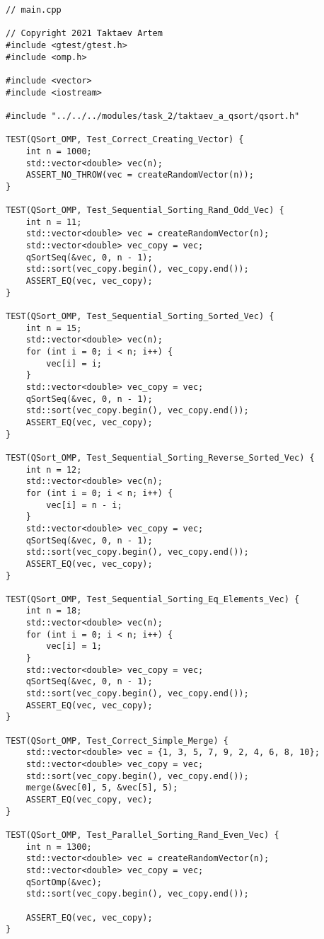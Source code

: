 \documentclass{report}
\begin{document}
\begin{lstlisting}
// main.cpp

// Copyright 2021 Taktaev Artem
#include <gtest/gtest.h>
#include <omp.h>

#include <vector>
#include <iostream>

#include "../../../modules/task_2/taktaev_a_qsort/qsort.h"

TEST(QSort_OMP, Test_Correct_Creating_Vector) {
    int n = 1000;
    std::vector<double> vec(n);
    ASSERT_NO_THROW(vec = createRandomVector(n));
}

TEST(QSort_OMP, Test_Sequential_Sorting_Rand_Odd_Vec) {
    int n = 11;
    std::vector<double> vec = createRandomVector(n);
    std::vector<double> vec_copy = vec;
    qSortSeq(&vec, 0, n - 1);
    std::sort(vec_copy.begin(), vec_copy.end());
    ASSERT_EQ(vec, vec_copy);
}

TEST(QSort_OMP, Test_Sequential_Sorting_Sorted_Vec) {
    int n = 15;
    std::vector<double> vec(n);
    for (int i = 0; i < n; i++) {
        vec[i] = i;
    }
    std::vector<double> vec_copy = vec;
    qSortSeq(&vec, 0, n - 1);
    std::sort(vec_copy.begin(), vec_copy.end());
    ASSERT_EQ(vec, vec_copy);
}

TEST(QSort_OMP, Test_Sequential_Sorting_Reverse_Sorted_Vec) {
    int n = 12;
    std::vector<double> vec(n);
    for (int i = 0; i < n; i++) {
        vec[i] = n - i;
    }
    std::vector<double> vec_copy = vec;
    qSortSeq(&vec, 0, n - 1);
    std::sort(vec_copy.begin(), vec_copy.end());
    ASSERT_EQ(vec, vec_copy);
}

TEST(QSort_OMP, Test_Sequential_Sorting_Eq_Elements_Vec) {
    int n = 18;
    std::vector<double> vec(n);
    for (int i = 0; i < n; i++) {
        vec[i] = 1;
    }
    std::vector<double> vec_copy = vec;
    qSortSeq(&vec, 0, n - 1);
    std::sort(vec_copy.begin(), vec_copy.end());
    ASSERT_EQ(vec, vec_copy);
}

TEST(QSort_OMP, Test_Correct_Simple_Merge) {
    std::vector<double> vec = {1, 3, 5, 7, 9, 2, 4, 6, 8, 10};
    std::vector<double> vec_copy = vec;
    std::sort(vec_copy.begin(), vec_copy.end());
    merge(&vec[0], 5, &vec[5], 5);
    ASSERT_EQ(vec_copy, vec);
}

TEST(QSort_OMP, Test_Parallel_Sorting_Rand_Even_Vec) {
    int n = 1300;
    std::vector<double> vec = createRandomVector(n);
    std::vector<double> vec_copy = vec;
    qSortOmp(&vec);
    std::sort(vec_copy.begin(), vec_copy.end());

    ASSERT_EQ(vec, vec_copy);
}


\end{lstlisting}
\end{document}
